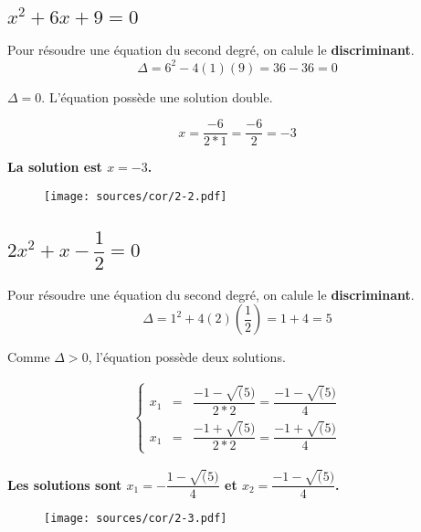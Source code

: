 \documentclass[11pt]{article}
\begin{document}
\begin{multicols}{2}
\subsection{$x^2 + 6x + 9 = 0$}

  Pour résoudre une équation du second degré, on calule le \textbf{discriminant}.
  $$\Delta = 6^2 - 4(1)(9) = 36 - 36 = 0$$

  $\Delta = 0$. L'équation possède une solution double.

  $$x = \dfrac{-6}{2*1} = \dfrac{-6}{2} = -3$$
  
  \textbf{La solution est $x = -3$.}

  \begin{figure}[H]
    \centering
    \texttt{[image: sources/cor/2-2.pdf]}
  \end{figure}

\end{multicols}

\noindent\hrulefill

\begin{multicols}{2}
\subsection{$2x^2 + x - \dfrac{1}{2} = 0$}

  Pour résoudre une équation du second degré, on calule le \textbf{discriminant}.
  $$\Delta = 1^2 + 4(2)(\dfrac{1}{2}) = 1 + 4 = 5$$

 Comme $\Delta > 0$, l'équation possède deux solutions.


  \begin{eqnarray*}
    \left\{
    \begin{aligned}
      x_1 &=& \dfrac{-1 - \sqrt(5)}{2*2} = \dfrac{-1 - \sqrt(5)}{4}\\
     x_1 &=& \dfrac{-1 + \sqrt(5)}{2*2} = \dfrac{-1 + \sqrt(5)}{4}
    \end{aligned}
    \right.
  \end{eqnarray*}

  \textbf{Les solutions sont $x_1 = -\dfrac{1 - \sqrt(5)}{4}$ et $x_2 = \dfrac{-1 - \sqrt(5)}{4} $.}


  \begin{figure}[H]
    \centering
    \texttt{[image: sources/cor/2-3.pdf]}
  \end{figure}

\end{multicols}
\end{document}
